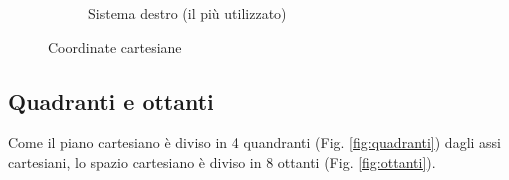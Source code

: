 \documentclass{article}     %
\begin{document}
\begin{center}
\begin{figure}[h]
\begin{subfigure}{0.30\textwidth}
\begin{center}
                    \end{center}
                    \caption{Sistema destro (il più utilizzato)}
                \end{subfigure}
                \caption{Coordinate cartesiane}
            \end{figure}    

        \end{center}
        
        \subsection{Quadranti e ottanti}
            Come il piano cartesiano è diviso in 4 quandranti (Fig. \ref{fig:quadranti}) dagli assi cartesiani, lo spazio cartesiano è diviso in 8 ottanti (Fig. \ref{fig:ottanti}).
\end{document}
